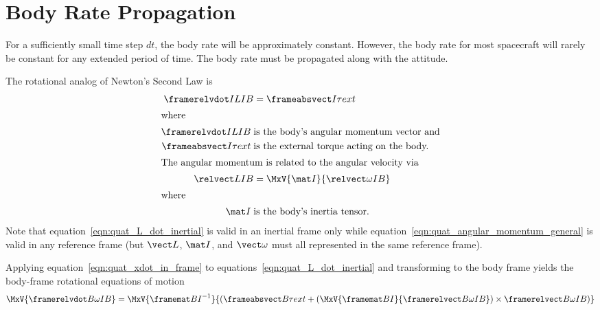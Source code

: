 \section{Body Rate Propagation}\label{sec:app_rate_prop}

For a sufficiently small time step $dt$, the body rate will be approximately constant.
However, the body rate for most spacecraft will rarely be constant for any extended period of time.
The body rate must be propagated along with the attitude.

The rotational analog of Newton's Second Law is \cite{Goldstein}
\begin{align}
  \framerelvdot I L I B &= \frameabsvect I {\tau} {ext}
    \label{eqn:quat_L_dot_inertial} \\
\intertext{where}
\framerelvdot I L I B\;&\text{is the body's angular momentum vector and} \nonumber \\
\frameabsvect I {\tau} {ext}\;&\text{is the external torque acting on the body.} \nonumber \\
\intertext{The angular momentum is related to the angular velocity via}
  \relvect L I B &= \MxV{\mat I}{\relvect \omega I B}
    \label{eqn:quat_angular_momentum_general}\\
\intertext{where}
\mat I\;&\text{is the body's inertia tensor.} \nonumber
\end{align}
Note that equation~\eqref{eqn:quat_L_dot_inertial} is valid in an inertial frame only
while equation~\eqref{eqn:quat_angular_momentum_general} is valid in any reference frame
(but $\vect L$, $\mat I$, and $\vect \omega$ must all represented in the same reference frame).

Applying equation~\eqref{eqn:quat_xdot_in_frame} to equations~\eqref{eqn:quat_L_dot_inertial}
and transforming to the body frame
yields the body-frame rotational equations of motion
\begin{equation}
  \MxV{\framerelvdot B \omega I B} =
  \MxV
    {{\framemat B I}^{-1}}
    {\left(
      \frameabsvect B {\tau} {ext}  +
      \left(\MxV{\framemat B I}{\framerelvect B \omega I B}\right) \times \framerelvect B \omega I B
    \right)}
    \label{eqn:quat_omega_dot_EOM}
\end{equation}

